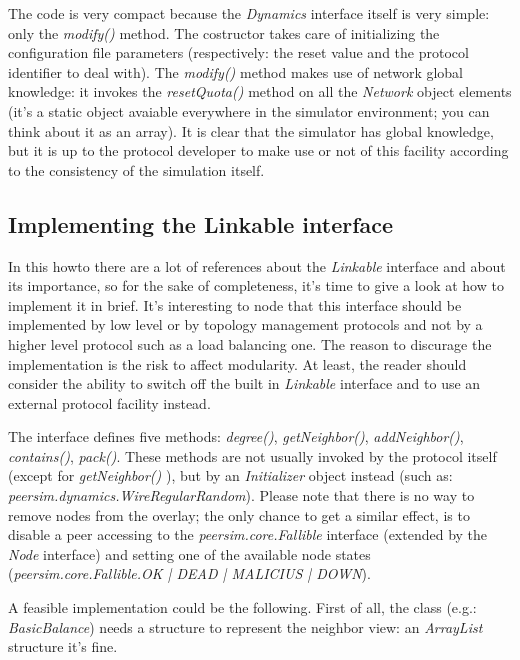 \documentclass[a4paper,11pt]{article}
\begin{document}
The code is very compact because the \emph{Dynamics} interface itself
is very simple: only the \emph{modify()} method. The costructor takes
care of initializing the configuration file parameters (respectively:
the reset value and the protocol identifier to deal with). The \emph{modify()}
method makes use of network global knowledge: it invokes the \emph{resetQuota()}
method on all the \emph{Network} object elements (it's a static
object avaiable everywhere in the simulator environment; you can think
about it as an array). It is clear that the simulator has global knowledge,
but it is up to the protocol developer to make use or not of this
facility according to the consistency of the simulation itself. 


\subsection{Implementing the Linkable interface}

In this howto there are a lot of references about the \emph{Linkable}
interface and about its importance, so for the sake of completeness,
it's time to give a look at how to implement it in brief. It's interesting
to node that this interface should be implemented by low level or
by topology management protocols and not by a higher level protocol
such as a load balancing one. The reason to discurage the implementation
is the risk to affect modularity. At least, the reader should consider
the ability to switch off the built in \emph{Linkable} interface and
to use an external protocol facility instead.

The interface defines five methods: \emph{degree()}, \emph{getNeighbor()},
\emph{addNeighbor()}, \emph{contains()}, \emph{pack()}. These methods
are not usually invoked by the protocol itself (except for \emph{getNeighbor()}
), but by an \emph{Initializer} object instead (such as: 
\emph{peersim.dynamics.WireRegularRandom}).
Please note that there
is no way to remove nodes from the overlay; the only chance to get
a similar effect, is to disable a peer accessing to the \emph{peersim.core.Fallible}
interface (extended by the \emph{Node} interface) and setting one
of the available node states (\emph{peersim.core.Fallible.OK | DEAD | 
MALICIUS | DOWN}). 

A feasible implementation could be the following. First of all, the
class (e.g.: \emph{BasicBalance}) needs a structure to represent the
neighbor view: an \emph{ArrayList} structure it's fine.\\
\end{document}
